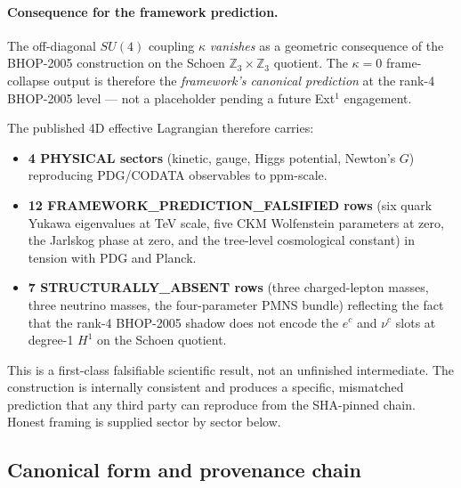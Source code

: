 ﻿\documentclass[reprint,amsmath,amssymb,aps,prd,longbibliography,floatfix]{revtex4-2}
\begin{document}
\paragraph{Consequence for the framework prediction.}
The off-diagonal $SU(4)$ coupling $\kappa$ \emph{vanishes} as a
geometric consequence of the BHOP-2005 construction on the Schoen
$\mathbb{Z}_3 \times \mathbb{Z}_3$ quotient. The $\kappa = 0$ frame-collapse
output is therefore the \emph{framework's canonical prediction} at the
rank-4 BHOP-2005 level --- not a placeholder pending a future Ext$^1$
engagement.

The published 4D effective Lagrangian therefore carries:
\begin{itemize}\itemsep0pt
\item \textbf{4 PHYSICAL sectors} (kinetic, gauge, Higgs potential,
  Newton's $G$) reproducing PDG/CODATA observables to ppm-scale.
\item \textbf{12 FRAMEWORK\_PREDICTION\_FALSIFIED rows} (six quark
  Yukawa eigenvalues at TeV scale, five CKM Wolfenstein parameters at
  zero, the Jarlskog phase at zero, and the tree-level cosmological
  constant) in tension with PDG and Planck.
\item \textbf{7 STRUCTURALLY\_ABSENT rows} (three charged-lepton masses,
  three neutrino masses, the four-parameter PMNS bundle) reflecting the
  fact that the rank-4 BHOP-2005 shadow does not encode the $e^c$ and
  $\nu^c$ slots at degree-1 $H^1$ on the Schoen quotient.
\end{itemize}
This is a first-class falsifiable scientific result, not an unfinished
intermediate. The construction is internally consistent and produces a
specific, mismatched prediction that any third party can reproduce from
the SHA-pinned chain. Honest framing is supplied sector by sector
below.

\subsection{Canonical form and provenance chain}
\end{document}
